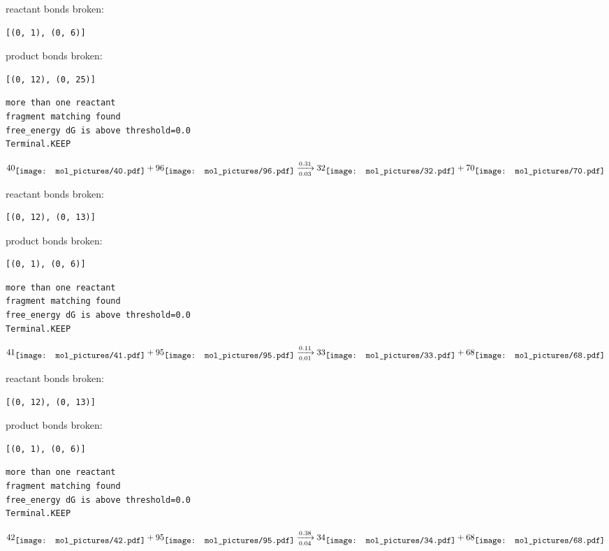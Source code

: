 \documentclass{article}
\begin{document}
reactant bonds broken:\begin{verbatim}
[(0, 1), (0, 6)]
\end{verbatim}
product bonds broken:\begin{verbatim}
[(0, 12), (0, 25)]
\end{verbatim}




\vspace{1cm}
\begin{verbatim}
more than one reactant
fragment matching found
free_energy dG is above threshold=0.0
Terminal.KEEP
\end{verbatim}
$$
40
\raisebox{-.5\height}{\texttt{[image: mol\_pictures/40.pdf]}}
+
96
\raisebox{-.5\height}{\texttt{[image: mol\_pictures/96.pdf]}}
\xrightarrow[0.03]{0.31}
32
\raisebox{-.5\height}{\texttt{[image: mol\_pictures/32.pdf]}}
+
70
\raisebox{-.5\height}{\texttt{[image: mol\_pictures/70.pdf]}}
$$


reactant bonds broken:\begin{verbatim}
[(0, 12), (0, 13)]
\end{verbatim}
product bonds broken:\begin{verbatim}
[(0, 1), (0, 6)]
\end{verbatim}




\vspace{1cm}
\begin{verbatim}
more than one reactant
fragment matching found
free_energy dG is above threshold=0.0
Terminal.KEEP
\end{verbatim}
$$
41
\raisebox{-.5\height}{\texttt{[image: mol\_pictures/41.pdf]}}
+
95
\raisebox{-.5\height}{\texttt{[image: mol\_pictures/95.pdf]}}
\xrightarrow[0.01]{0.11}
33
\raisebox{-.5\height}{\texttt{[image: mol\_pictures/33.pdf]}}
+
68
\raisebox{-.5\height}{\texttt{[image: mol\_pictures/68.pdf]}}
$$


reactant bonds broken:\begin{verbatim}
[(0, 12), (0, 13)]
\end{verbatim}
product bonds broken:\begin{verbatim}
[(0, 1), (0, 6)]
\end{verbatim}




\vspace{1cm}
\begin{verbatim}
more than one reactant
fragment matching found
free_energy dG is above threshold=0.0
Terminal.KEEP
\end{verbatim}
$$
42
\raisebox{-.5\height}{\texttt{[image: mol\_pictures/42.pdf]}}
+
95
\raisebox{-.5\height}{\texttt{[image: mol\_pictures/95.pdf]}}
\xrightarrow[0.04]{0.38}
34
\raisebox{-.5\height}{\texttt{[image: mol\_pictures/34.pdf]}}
+
68
\raisebox{-.5\height}{\texttt{[image: mol\_pictures/68.pdf]}}
$$
\end{document}
